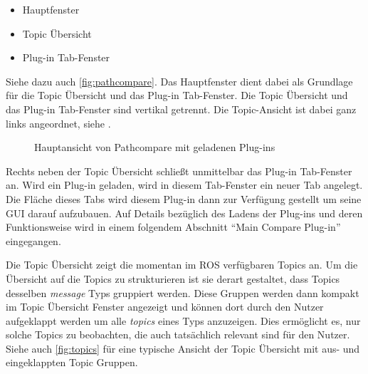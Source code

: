 \begin{itemize}
\item Hauptfenster
\item Topic Übersicht
\item Plug-in Tab-Fenster
\end{itemize}

Siehe dazu auch \autoref{fig:pathcompare}.
Das Hauptfenster dient dabei als Grundlage für die Topic Übersicht und das
Plug-in Tab-Fenster. Die Topic Übersicht und das Plug-in Tab-Fenster sind vertikal
getrennt. Die Topic-Ansicht ist dabei ganz links angeordnet, siehe   .

\begin{figure}[t]
  \begin{center}
  \end{center}
  \caption{Hauptansicht von Pathcompare mit geladenen Plug-ins}
  \label{fig:pathcompare}
\end{figure}

Rechts neben der Topic Übersicht schließt unmittelbar das Plug-in Tab-Fenster
an. Wird ein Plug-in geladen, wird in diesem Tab-Fenster ein neuer Tab
angelegt. Die Fläche dieses Tabs wird diesem Plug-in dann zur Verfügung
gestellt um seine GUI darauf aufzubauen. Auf Details bezüglich des Ladens der
Plug-ins und deren Funktionsweise wird in einem folgendem Abschnitt ``Main
Compare Plug-in'' eingegangen. 

Die Topic Übersicht zeigt die momentan im ROS verfügbaren Topics an. 
Um die Übersicht auf die Topics zu strukturieren ist sie derart
gestaltet, dass Topics desselben \textit{message} Typs gruppiert werden. Diese
Gruppen werden dann kompakt im Topic Übersicht Fenster angezeigt und können dort durch
den Nutzer aufgeklappt werden um alle \textit{topics} eines Typs anzuzeigen.
Dies ermöglicht es, nur solche Topics zu beobachten, die auch
tatsächlich relevant sind für den Nutzer. 
Siehe auch \autoref{fig:topics} für eine typische Ansicht der Topic Übersicht mit aus- und
eingeklappten Topic Gruppen.

